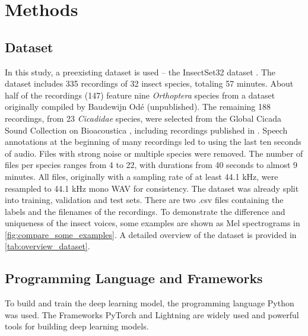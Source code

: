 

\section{Methods}
\label{methods}

\subsection{Dataset}%

In this study, a preexisting dataset is used -- the InsectSet32 dataset \autocite{faissInsectSet32DatasetAutomatic2022}. 
The dataset includes 335 recordings of 32 insect species, totaling 57 minutes.
About half of the recordings (147) feature nine \textit{Orthoptera} species from a dataset originally compiled by Baudewijn Odé (unpublished). 
The remaining 188 recordings, from 23 \textit{Cicadidae} species, were selected from the Global Cicada Sound 
Collection on Bioacoustica \autocite{bakerBioAcousticaFreeOpen2015}, including recordings 
published in \autocites{bakerGlobalCicadaSound2015}{poppleRevisionMyopsaltaCrucifera2017}. 
Speech annotations at the beginning of many recordings led to using the last ten seconds of audio. 
Files with strong noise or multiple species were removed. The number of files per species ranges from 4 to 22, 
with durations from 40 seconds to almost 9 minutes. All files, originally with a sampling rate of at least 44.1 kHz, 
were resampled to 44.1 kHz mono WAV for consistency.
The dataset was already split into training, validation and test sets. There are two .csv files containing
the labels and the filenames of the recordings. To demonstrate the difference and uniqueness of the insect voices, some examples are shown 
as Mel spectrograms in \autoref{fig:compare_some_examples}. A detailed overview of the dataset is provided in \autoref{tab:overview_dataset}.



\subsection{Programming Language and Frameworks}%
To build and train the deep learning model, the programming language Python was used.
The Frameworks PyTorch and Lightning are widely used and powerful tools for building deep learning models.

